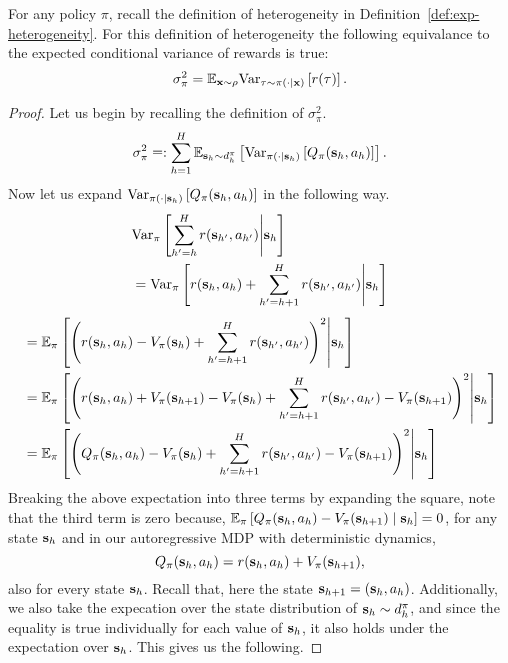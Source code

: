 \begin{lemma}
  \label{lem:total-variance}
  For any policy $\pi$, recall the definition of heterogeneity in Definition~\ref{def:exp-heterogeneity}. For this definition of heterogeneity the following equivalance to the expected conditional variance of rewards is true:
  \begin{align*}
    \sigma^2_\pi = \mathbb{E}_{\mathbf{x} \sim \rho} \mathrm{Var}_{\tau \sim \pi(\cdot \mid \mathbf{x})} \left [ r(\tau) \right ].  
  \end{align*}
\end{lemma}
\begin{proof}
Let us begin by recalling the definition of $\sigma^2_\pi$. 
 \begin{align*}    
    \sigma^2_{\pi} \mathrel{\mathop=}: \sum_{h=1}^{H} \mathbb{E}_{\mathbf{s}_h \sim d^{\pi}_{h}}\left [ \mathrm{Var}_{\pi(\cdot \mid \mathbf{s}_h)}\left [ Q_{\pi}(\mathbf{s}_h, a_h) \right ] \right ].
    \end{align*}
Now let us expand $\mathrm{Var}_{\pi(\cdot \mid \mathbf{s}_h)}\left [ Q_{\pi}(\mathbf{s}_h, a_h) \right ]$ in the following way.
\begin{align*}
&\mathrm{Var}_{\pi}\left [ \sum_{h^\prime = h}^H r(\mathbf{s}_{h^\prime}, a_{h^\prime}) \middle| \mathbf{s}_h \right ] \\
    &= \mathrm{Var}_{\pi}\left [ r(\mathbf{s}_h, a_h) + \sum_{h^\prime = h+1}^H r(\mathbf{s}_{h^\prime}, a_{h^\prime}) \middle| \mathbf{s}_h \right ] 
\end{align*}
\begin{align*}
     &= \mathbb{E}_{\pi}\left [ \left( r(\mathbf{s}_h, a_h) - V_\pi(\mathbf{s}_h) + \sum_{h^\prime = h+1}^H r(\mathbf{s}_{h^\prime}, a_{h^\prime}) \right)^2 \middle| \mathbf{s}_h \right ] \\
    &=  \mathbb{E}_{\pi}\left [ \left( r(\mathbf{s}_h, a_h) + V_\pi(\mathbf{s}_{h+1}) - V_\pi(\mathbf{s}_h) + \sum_{h^\prime = h+1}^H r(\mathbf{s}_{h^\prime}, a_{h^\prime}) - V_\pi(\mathbf{s}_{h+1}) \right)^2 \middle| \mathbf{s}_h \right ] \\
    &=  \mathbb{E}_{\pi}\left [ \left( Q_\pi (\mathbf{s}_h, a_h) - V_\pi(\mathbf{s}_h) + \sum_{h^\prime = h+1}^H r(\mathbf{s}_{h^\prime}, a_{h^\prime}) - V_\pi(\mathbf{s}_{h+1}) \right)^2 \middle| \mathbf{s}_h \right ]
\end{align*}
Breaking the above expectation into three terms by expanding the square, note that the third term is zero because, $\mathbb{E}_{\pi} \left [ Q_\pi(\mathbf{s}_h, a_h) - V_\pi(\mathbf{s}_{h+1}) \mid \mathbf{s}_h \right ] = 0$, for any state $\mathbf{s}_h$ and in our autoregressive MDP with deterministic dynamics, $$Q_\pi(\mathbf{s}_h, a_h) = r(\mathbf{s}_h, a_h) + V_\pi(\mathbf{s}_{h+1}),$$ also for every state $\mathbf{s}_h$. Recall that, here the state $\mathbf{s}_{h+1} = (\mathbf{s}_h, a_h)$. Additionally, we also take the expecation over the state distribution of $\mathbf{s}_h \sim d^\pi_h$, and since the equality is true individually for each value of $\mathbf{s}_h$, it also holds under the expectation over $\mathbf{s}_h$. This gives us the following.  

\end{proof}
